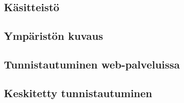 
\subsection{Käsitteistö}

\subsection{Ympäristön kuvaus}

\subsection{Tunnistautuminen web-palveluissa}

\subsection{Keskitetty tunnistautuminen}

